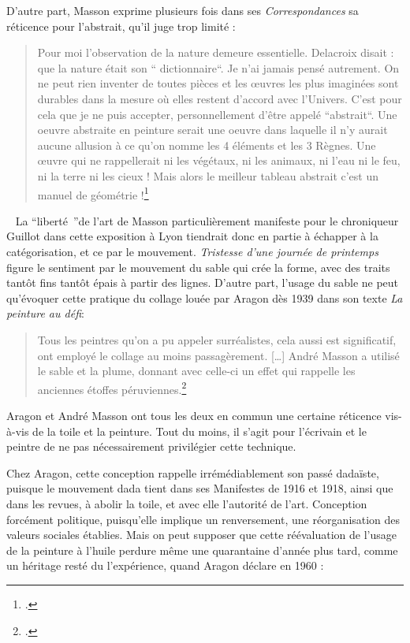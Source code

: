 D’autre part, Masson exprime plusieurs fois dans ses \emph{Correspondances} sa réticence pour l’abstrait, qu’il juge trop limité : 

\begin{quote}
Pour moi l’observation de la nature demeure essentielle. Delacroix disait : que la nature était son “ dictionnaire“. Je n’ai jamais pensé autrement. On ne peut rien inventer de toutes pièces et les \oe{}uvres les plus imaginées sont durables dans la mesure où elles restent d’accord avec l’Univers. C’est pour cela que je ne puis accepter, personnellement d’être appelé “abstrait“. Une oeuvre abstraite en peinture serait une oeuvre dans laquelle il n’y aurait aucune allusion à ce qu’on nomme les 4 éléments et les 3 Règnes. Une \oe{}uvre qui ne rappellerait ni les végétaux, ni les animaux, ni l’eau ni le feu, ni la terre ni les cieux ! Mais alors le meilleur tableau abstrait c’est un manuel de géométrie !\footcite[p464]{anneessurrealistes}\end{quote}
 
	La \enquote{liberté }de l’art de Masson particulièrement manifeste pour le chroniqueur Guillot dans cette exposition à Lyon tiendrait donc en partie à échapper à la catégorisation, et ce par le mouvement. \emph{Tristesse d’une journée de printemps} figure le sentiment par le mouvement du sable qui crée la forme, avec des traits tantôt fins tantôt épais à partir des lignes. D’autre part, l'usage du sable ne peut qu’évoquer cette pratique du collage louée par Aragon dès 1939 dans son texte \emph{La peinture au défi}:
\begin{quote}
Tous les peintres qu’on a pu appeler surréalistes, cela aussi est significatif, ont employé le collage au moins passagèrement. […] André Masson a utilisé le sable et la plume, donnant avec celle-ci un effet qui rappelle les anciennes étoffes péruviennes.\footcite[p78]{ecritssurla}\end{quote}	

 	 Aragon et André Masson ont tous les deux en commun une certaine réticence vis-à-vis de la toile et la peinture. Tout du moins, il s’agit pour l’écrivain et le peintre de ne pas nécessairement privilégier cette technique. 

	Chez Aragon, cette conception rappelle irrémédiablement son passé dadaïste, puisque le mouvement dada tient dans ses Manifestes de 1916 et 1918, ainsi que dans les revues, à abolir la toile, et avec elle l’autorité de l’art. Conception forcément politique, puisqu’elle implique un renversement, une réorganisation des valeurs sociales établies. Mais on peut supposer que cette réévaluation de l’usage de la peinture à l’huile perdure même une quarantaine d’année plus tard, comme un héritage resté du l’expérience, quand Aragon déclare en 1960 : 


